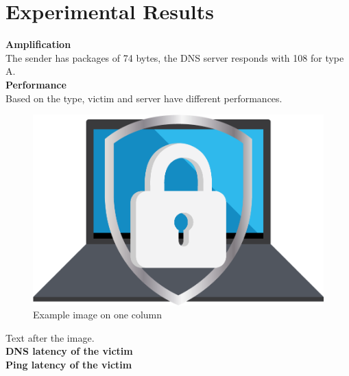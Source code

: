 \section{Experimental Results}
\noindent \textbf{Amplification}\\
The sender has packages of 74 bytes, the DNS server responds with 108 for type A.\\
\textbf{Performance}\\
Based on the type, victim and server have different performances.\\
\begin{figure}[H]
    \centering
    \includegraphics[width=\columnwidth]{Sections/Images/example.png}
    \caption{Example image on one column}
    \label{fig:example}
\end{figure}
\noindent Text after the image.\\
{\bfseries DNS latency of the victim}\\
{\bfseries Ping latency of the victim}\\